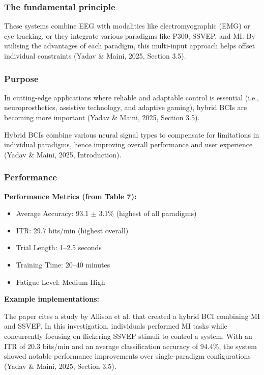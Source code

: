 \documentclass[12pt]{article}
\begin{document}
\subsubsection{The fundamental principle}

These systems combine EEG with modalities like electromyographic (EMG) or eye tracking, or they integrate various paradigms like P300, SSVEP, and MI. By utilising the advantages of each paradigm, this multi-input approach helps offset individual constraints (Yadav \& Maini, 2025, Section 3.5).

\subsubsection{Purpose}

In cutting-edge applications where reliable and adaptable control is essential (i.e., neuroprosthetics, assistive technology, and adaptive gaming), hybrid BCIs are becoming more important (Yadav \& Maini, 2025, Section 3.5).

Hybrid BCIs combine various neural signal types to compensate for limitations in individual paradigms, hence improving overall performance and user experience (Yadav \& Maini, 2025, Introduction).

\subsubsection{Performance}

\textbf{Performance Metrics (from Table 7):}
\begin{itemize}
    \item Average Accuracy: 93.1 $\pm$ 3.1\% (highest of all paradigms)
    \item ITR: 29.7 bits/min (highest overall)
    \item Trial Length: 1–2.5 seconds
    \item Training Time: 20–40 minutes
    \item Fatigue Level: Medium-High
\end{itemize}

\textbf{Example implementations:}

The paper cites a study by Allison et al. that created a hybrid BCI combining MI and SSVEP. In this investigation, individuals performed MI tasks while concurrently focusing on flickering SSVEP stimuli to control a system. With an ITR of 20.3 bits/min and an average classification accuracy of 94.4\%, the system showed notable performance improvements over single-paradigm configurations (Yadav \& Maini, 2025, Section 3.5).
\end{document}
